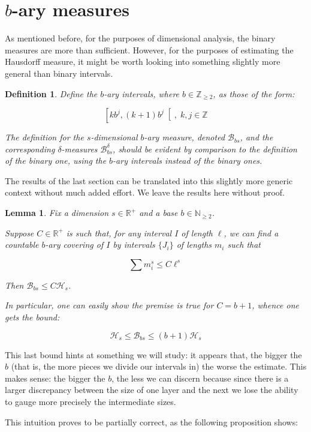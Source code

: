 \documentclass[11pt]{amsart}
\newcommand{\R}{\mathbb{R}}
\newcommand{\Z}{\mathbb{Z}}
\newcommand{\N}{\mathbb{N}}
\newcommand{\HH}{\mathcal{H}}
\newcommand{\BB}{\mathcal{B}}
\newtheorem{lemma}{Lemma}
\newtheorem{definition}{Definition}
\begin{document}
\section{$b$-ary measures}

As mentioned before, for the purposes of dimensional analysis, the binary measures are more than sufficient. However, for the purposes of estimating the Hausdorff measure, it might be worth looking into something slightly more general than binary intervals.

\begin{definition}
Define the $b$-ary intervals, where $b \in \Z_{\geq 2}$, as those of the form:

\[\left[k b^j, (k+1) b^j \right[, \;k, j \in \Z\]

The definition for the $s$-dimensional $b$-ary measure, denoted $\BB_{bs}$, and the corresponding $\delta$-measures $\BB_{bs}^\delta$, should be evident by comparison to the definition of the binary one, using the $b$-ary intervals instead of the binary ones.
\end{definition}

The results of the last section can be translated into this slightly more generic context without much added effort. We leave the results here without proof.

\begin{lemma}
Fix a dimension $s \in \R^+$ and a base $b \in \N_{\geq 2}$.

Suppose $C \in \R^+$ is such that, for any interval $I$ of length $\ell$, we can find a countable $b$-ary covering of $I$ by intervals $\{J_i\}$ of lengths $m_i$ such that

\[\sum m_i^s \leq C \ell^s\]

Then $\BB_{bs} \leq C \HH_s$.

In particular, one can easily show the premise is true for $C = b+1$, whence one gets the bound:

\[\HH_s \leq \BB_{bs} \leq (b+1) \HH_s\]
\end{lemma}

This last bound hints at something we will study: it appears that, the bigger the $b$ (that is, the more pieces we divide our intervals in) the worse the estimate. This makes sense: the bigger the $b$, the less we can discern because since there is a larger discrepancy between the size of one layer and the next we lose the ability to gauge more precisely the intermediate sizes.

This intuition proves to be partially correct, as the following proposition shows:
\end{document}
